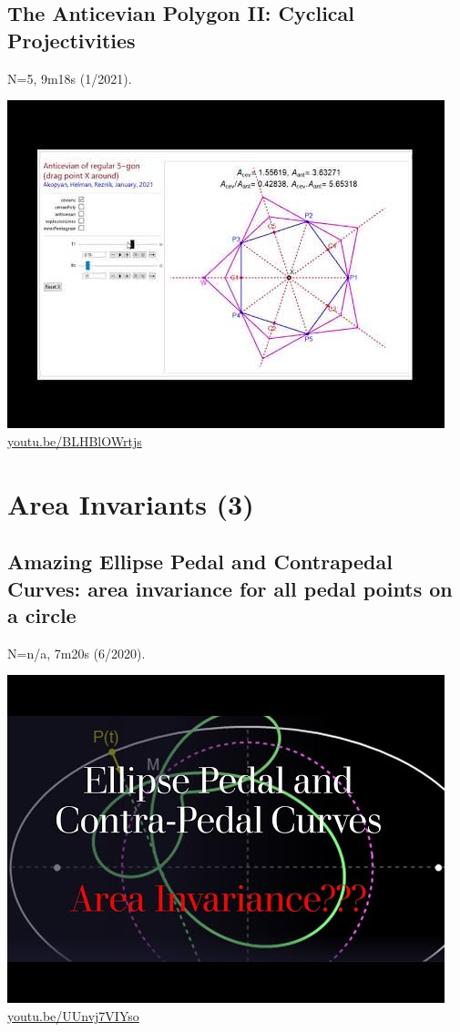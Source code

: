 \documentclass[12pt]{amsart}
\begin{document}
\subsection{The Anticevian Polygon II: Cyclical Projectivities}
\label{vid:BLHBlOWrtjs}
\noindent N=5, 9m18s (1/2021). 
\begin{center}\includegraphics[width=.5\textwidth]{pics/BLHBlOWrtjs.jpg} \\ 
\href{https://youtu.be/BLHBlOWrtjs}{\url{youtu.be/BLHBlOWrtjs}}\end{center}
% 

\section{Area Invariants (3)}

\subsection{Amazing Ellipse Pedal and Contrapedal Curves: area invariance for all pedal points on a circle}
\label{vid:UUnvj7VIYso}
\noindent N=n/a, 7m20s (6/2020). 
\begin{center}\includegraphics[width=.5\textwidth]{pics/UUnvj7VIYso.jpg} \\ 
\href{https://youtu.be/UUnvj7VIYso}{\url{youtu.be/UUnvj7VIYso}}\end{center}
% 
\end{document}

